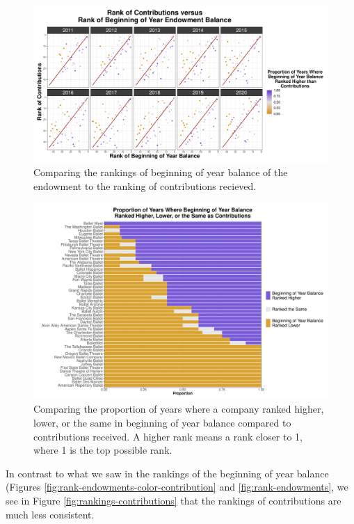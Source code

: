 \documentclass[Dance Data
Project,article,submit,moreauthors,pdftex]{mdpi}
\begin{document}
\begin{figure}[H]
\includegraphics[width=0.75\linewidth,]{../images/compare-rankings-balance-contributions} \caption{\label{fig:balancecont} Comparing the rankings of beginning of year balance of the endowment to the ranking of contributions recieved.}\label{fig:compare-rankings-balance-contributions}
\end{figure}

\begin{figure}[H]
\includegraphics[width=0.75\linewidth,]{../images/compare-rankings-balance-contributions-barplot} \caption{\label{fig:balancecontbar} Comparing the proportion of years where a company ranked higher, lower, or the same in beginning of year balance compared to contributions received. A higher rank means a rank closer to 1, where 1 is the top possible rank.}\label{fig:compare-rankings-balance-contributions-barplot}
\end{figure}

In contrast to what we saw in the rankings of the beginning of year
balance (Figures \ref{fig:rank-endowments-color-contribution} and
\ref{fig:rank-endowments}, we see in Figure
\ref{fig:rankings-contributions} that the rankings of contributions are
much less consistent.
\end{document}
